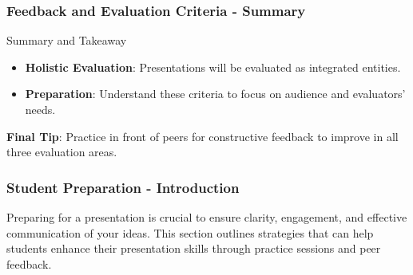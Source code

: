 \documentclass[aspectratio=169]{beamer}
\begin{document}
\begin{frame}[fragile]
    \frametitle{Feedback and Evaluation Criteria - Summary}
    \begin{block}{Summary and Takeaway}
        \begin{itemize}
            \item \textbf{Holistic Evaluation}: Presentations will be evaluated as integrated entities.
            \item \textbf{Preparation}: Understand these criteria to focus on audience and evaluators' needs.
        \end{itemize}
        \textbf{Final Tip}: Practice in front of peers for constructive feedback to improve in all three evaluation areas.
    \end{block}
\end{frame}

\begin{frame}[fragile]
    \frametitle{Student Preparation - Introduction}
    Preparing for a presentation is crucial to ensure clarity, engagement, and effective communication of your ideas. This section outlines strategies that can help students enhance their presentation skills through practice sessions and peer feedback.
\end{frame}
\end{document}
